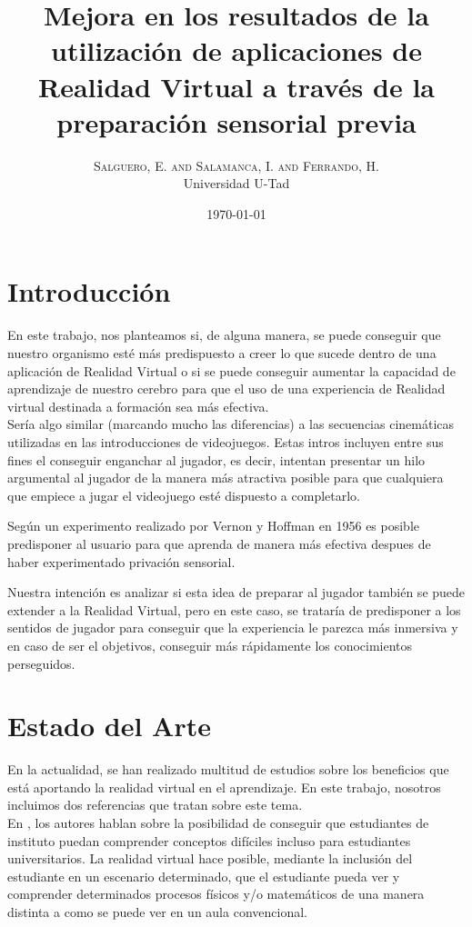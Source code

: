 \documentclass[twoside,twocolumn]{article}
\title{Mejora en los resultados de la utilización de aplicaciones de Realidad Virtual a través de la preparación sensorial previa} %
\author{%
\textsc{Salguero, E. and Salamanca, I. and Ferrando, H.} \\%
\normalsize Universidad U-Tad \\ %
}
\date{\today} %
\begin{document}
\fancyhead{} %

\maketitle

\section{Introducción}
En este trabajo, nos planteamos si, de alguna manera, se puede conseguir que nuestro organismo esté más predispuesto a creer lo que sucede dentro de una aplicación de Realidad Virtual o si se puede conseguir aumentar la capacidad de aprendizaje de nuestro cerebro para que el uso de una experiencia de Realidad virtual destinada a formación sea más efectiva.\\

Sería algo similar (marcando mucho las diferencias) a las secuencias cinemáticas utilizadas en las introducciones de videojuegos. Estas intros incluyen entre sus fines el conseguir enganchar al jugador, es decir, intentan presentar un hilo argumental al jugador de la manera más atractiva posible para que cualquiera que empiece a jugar el videojuego esté dispuesto a completarlo.

Según un experimento realizado por Vernon y Hoffman en 1956 \cite{PrivacionSensorial} es posible predisponer al usuario para que aprenda de manera más efectiva despues de haber experimentado privación sensorial.

Nuestra intención es analizar si esta idea de preparar al jugador también se puede extender a la Realidad Virtual, pero en este caso, se trataría de predisponer a los sentidos de jugador para conseguir que la experiencia le parezca más inmersiva y en caso de ser el objetivos, conseguir más rápidamente los conocimientos perseguidos.


\section{Estado del Arte}
En la actualidad, se han realizado multitud de estudios sobre los beneficios que está aportando la realidad virtual en el aprendizaje. En este trabajo, nosotros incluimos dos referencias que tratan sobre este tema.\\

En \cite{ScienceSpace}, los autores hablan sobre la posibilidad de conseguir que estudiantes de instituto puedan comprender conceptos difíciles incluso para estudiantes universitarios. La realidad virtual hace posible, mediante la inclusión del estudiante en un escenario determinado, que el estudiante pueda ver y comprender determinados procesos físicos y/o matemáticos de una manera distinta a como se puede ver en un aula convencional.\\
\end{document}
